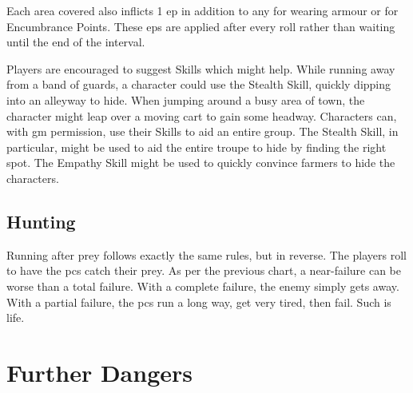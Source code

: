 \begin{multicols}{2}
Each area covered also inflicts 1 \gls{ep} in addition to any for wearing armour or for Encumbrance Points.
These \glspl{ep} are applied after every roll rather than waiting until the end of the interval.

Players are encouraged to suggest Skills which might help.
While running away from a band of guards, a character could use the Stealth Skill, quickly dipping into an alleyway to hide.
When jumping around a busy area of town, the character might leap over a moving cart to gain some headway.
Characters can, with \gls{gm} permission, use their Skills to aid an entire group.
The Stealth Skill, in particular, might be used to aid the entire troupe to hide by finding the right spot.
The Empathy Skill might be used to quickly convince farmers to hide the characters.

\subsection{Hunting}

Running after prey follows exactly the same rules, but in reverse.
The players roll to have the \glspl{pc} catch their prey.
As per the previous chart, a near-failure can be worse than a total failure.
With a complete failure, the enemy simply gets away.
With a partial failure, the \glspl{pc} run a long way, get very tired, then fail.
Such is life.

\end{multicols}

\huntchart

\section{Further Dangers}

